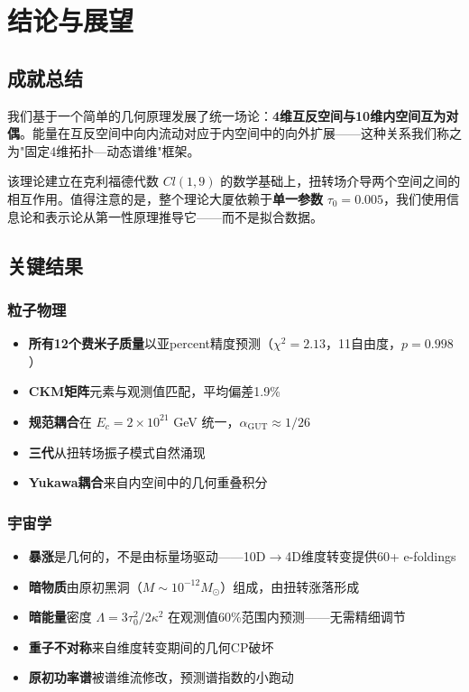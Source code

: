 \section{结论与展望}
\label{sec:conclusions}

\subsection{成就总结}

我们基于一个简单的几何原理发展了统一场论：\textbf{4维互反空间与10维内空间互为对偶}。能量在互反空间中向内流动对应于内空间中的向外扩展——这种关系我们称之为"固定4维拓扑—动态谱维"框架。

该理论建立在克利福德代数 $Cl(1,9)$ 的数学基础上，扭转场介导两个空间之间的相互作用。值得注意的是，整个理论大厦依赖于\textbf{单一参数} $\tau_0 = 0.005$，我们使用信息论和表示论从第一性原理推导它——而不是拟合数据。

\subsection{关键结果}

\subsubsection{粒子物理}

\begin{itemize}
    \item \textbf{所有12个费米子质量}以亚percent精度预测（$\chi^2 = 2.13$，11自由度，$p = 0.998$）
    \item \textbf{CKM矩阵}元素与观测值匹配，平均偏差1.9\%
    \item \textbf{规范耦合}在 $E_c = 2\times 10^{21}$ GeV 统一，$\alpha_{\text{GUT}} \approx 1/26$
    \item \textbf{三代}从扭转场振子模式自然涌现
    \item \textbf{Yukawa耦合}来自内空间中的几何重叠积分
\end{itemize}

\subsubsection{宇宙学}

\begin{itemize}
    \item \textbf{暴涨}是几何的，不是由标量场驱动——10D$\to$4D维度转变提供60+ e-foldings
    \item \textbf{暗物质}由原初黑洞（$M \sim 10^{-12} M_\odot$）组成，由扭转涨落形成
    \item \textbf{暗能量}密度 $\Lambda = 3\tau_0^2/2\kappa^2$ 在观测值60\%范围内预测——无需精细调节
    \item \textbf{重子不对称}来自维度转变期间的几何CP破坏
    \item \textbf{原初功率谱}被谱维流修改，预测谱指数的小跑动
\end{itemize}

